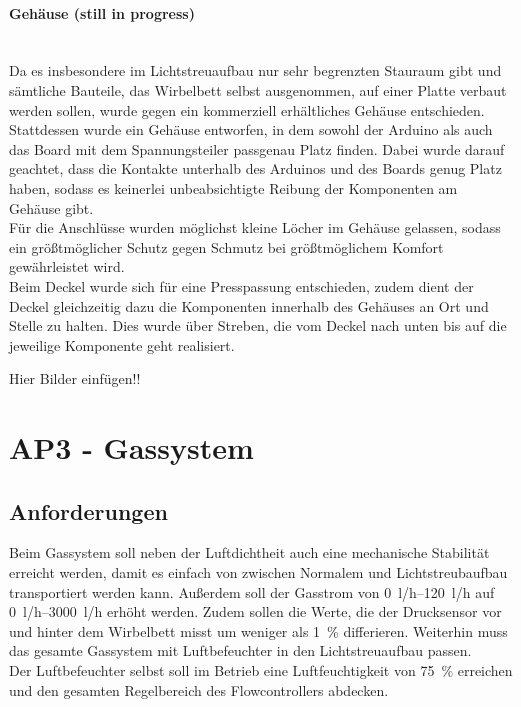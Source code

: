 \paragraph{Gehäuse (still in progress)} 
\hfill \\
Da es insbesondere im Lichtstreuaufbau nur sehr begrenzten Stauraum gibt und sämtliche Bauteile, das Wirbelbett selbst ausgenommen, auf einer Platte verbaut werden sollen, wurde gegen ein kommerziell erhältliches Gehäuse entschieden. \\ 
Stattdessen wurde ein Gehäuse entworfen, in dem sowohl der Arduino als auch das Board mit dem Spannungsteiler passgenau Platz finden. Dabei wurde darauf geachtet, dass die Kontakte unterhalb des Arduinos und des Boards genug Platz haben, sodass es keinerlei unbeabsichtigte Reibung der Komponenten am Gehäuse gibt. \\
Für die Anschlüsse wurden möglichst kleine Löcher im Gehäuse gelassen, sodass ein größtmöglicher Schutz gegen Schmutz bei größtmöglichem Komfort gewährleistet wird. \\
Beim Deckel wurde sich für eine Presspassung entschieden, zudem dient der Deckel gleichzeitig dazu die Komponenten innerhalb des Gehäuses an Ort und Stelle zu halten. Dies wurde über Streben, die vom Deckel nach unten bis auf die jeweilige Komponente geht realisiert.

Hier Bilder einfügen!!

\newpage

\section{AP3 - Gassystem}

\subsection{Anforderungen}

Beim Gassystem soll neben der Luftdichtheit auch eine mechanische Stabilität erreicht werden, damit es einfach von zwischen Normalem und Lichtstreubaufbau transportiert werden kann. Außerdem soll der Gasstrom von \SIrange{0}{120}{l/h} auf \SIrange{0}{3000}{l/h} erhöht werden. Zudem sollen die Werte, die der Drucksensor vor und hinter dem Wirbelbett misst um weniger als \SI{1}{\%} differieren. Weiterhin muss das gesamte Gassystem mit Luftbefeuchter in den Lichtstreuaufbau passen. \\
Der Luftbefeuchter selbst soll im Betrieb eine Luftfeuchtigkeit von \SI{75}{\%} erreichen und den gesamten Regelbereich des Flowcontrollers abdecken.



